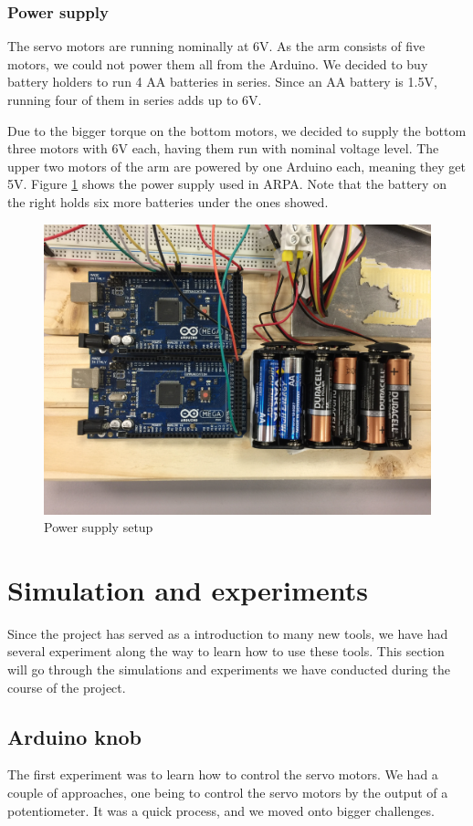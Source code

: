 \documentclass[11pt,a4paper, titlepage]{article}
\begin{document}
	\subsubsection{Power supply}
	The servo motors are running nominally at 6V. As the arm consists of five motors, we could not power them all from the Arduino. We decided to buy battery holders to run 4 AA batteries in series. Since an AA battery is 1.5V, running four of them in series adds up to 6V.
	
	Due to the bigger torque on the bottom motors, we decided to supply the bottom three motors with 6V each,  having them run with nominal voltage level. The upper two motors of the arm are powered by one Arduino each, meaning they get 5V. Figure \ref{fig:power} shows the power supply used in ARPA. Note that the battery on the right holds six more batteries under the ones showed.
	
	\begin{figure}[H]
		\centering
		\includegraphics[width=0.8\linewidth]{../Diagrams/PowerSupply.jpg}
		\caption{Power supply setup}
		\label{fig:power}
	\end{figure}
	
		
	\section{Simulation and experiments}
	Since the project has served as a introduction to many new tools, we have had several experiment along the way to learn how to use these tools. This section will go through the simulations and experiments we have conducted during the course of the project.
	
	\subsection{Arduino knob}
	The first experiment was to learn how to control the servo motors. We had a couple of approaches, one being to control the servo motors by the output of a potentiometer. It was a quick process, and we moved onto bigger challenges.
	
\end{document}
